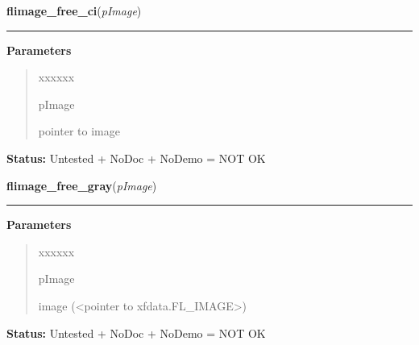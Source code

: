 \hspace{.8\funcindent}\begin{boxedminipage}{\funcwidth}

    \raggedright \textbf{flimage\_free\_ci}(\textit{pImage})

    \vspace{-1.5ex}

    \rule{\textwidth}{0.5\fboxrule}
\setlength{\parskip}{2ex}
\setlength{\parskip}{1ex}
      \textbf{Parameters}
      \vspace{-1ex}

      \begin{quote}
        \begin{Ventry}{xxxxxx}

          \item[pImage]

          pointer to image

        \end{Ventry}

      \end{quote}

\textbf{Status:} Untested + NoDoc + NoDemo = NOT OK



    \end{boxedminipage}

    \label{xformslib:flflimage:flimage_free_gray}

    \vspace{0.5ex}

\hspace{.8\funcindent}\begin{boxedminipage}{\funcwidth}

    \raggedright \textbf{flimage\_free\_gray}(\textit{pImage})

    \vspace{-1.5ex}

    \rule{\textwidth}{0.5\fboxrule}
\setlength{\parskip}{2ex}
\setlength{\parskip}{1ex}
      \textbf{Parameters}
      \vspace{-1ex}

      \begin{quote}
        \begin{Ventry}{xxxxxx}

          \item[pImage]

          image ({\textless}pointer to xfdata.FL\_IMAGE{\textgreater})

        \end{Ventry}

      \end{quote}

\textbf{Status:} Untested + NoDoc + NoDemo = NOT OK



    \end{boxedminipage}

